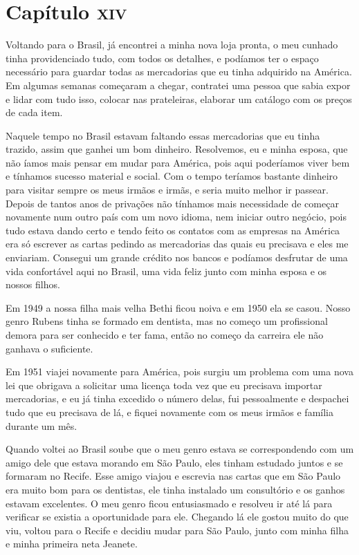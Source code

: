 \chapter{Capítulo \textsc{xiv}}

Voltando para o Brasil, já encontrei a minha nova loja pronta, o meu
cunhado tinha providenciado tudo, com todos os detalhes, e podíamos ter
o espaço necessário para guardar todas as mercadorias que eu tinha
adquirido na América. Em algumas semanas começaram a chegar, contratei
uma pessoa que sabia expor e lidar com tudo isso, colocar nas
prateleiras, elaborar um catálogo com os preços de cada item.

Naquele tempo no Brasil estavam faltando essas mercadorias que eu tinha
trazido, assim que ganhei um bom dinheiro. Resolvemos, eu e minha
esposa, que não íamos mais pensar em mudar para América, pois aqui
poderíamos viver bem e tínhamos sucesso material e social. Com o tempo
teríamos bastante dinheiro para visitar sempre os meus irmãos e irmãs, e
seria muito melhor ir passear. Depois de tantos anos de privações não
tínhamos mais necessidade de começar novamente num outro país com um
novo idioma, nem iniciar outro negócio, pois tudo estava dando certo e
tendo feito os contatos com as empresas na América era só escrever as
cartas pedindo as mercadorias das quais eu precisava e eles me
enviariam. Consegui um grande crédito nos bancos e podíamos desfrutar de
uma vida confortável aqui no Brasil, uma vida feliz junto com minha
esposa e os nossos filhos.

Em 1949 a nossa filha mais velha Bethi ficou noiva e em 1950 ela se
casou. Nosso genro Rubens tinha se formado em dentista, mas no começo um
profissional demora para ser conhecido e ter fama, então no começo da
carreira ele não ganhava o suficiente.

Em 1951 viajei novamente para América, pois surgiu um problema com uma
nova lei que obrigava a solicitar uma licença toda vez que eu precisava
importar mercadorias, e eu já tinha excedido o número delas, fui
pessoalmente e despachei tudo que eu precisava de lá, e fiquei novamente
com os meus irmãos e família durante um mês.

Quando voltei ao Brasil soube que o meu genro estava se correspondendo
com um amigo dele que estava morando em São Paulo, eles tinham estudado
juntos e se formaram no Recife. Esse amigo viajou e escrevia nas cartas
que em São Paulo era muito bom para os dentistas, ele tinha instalado um
consultório e os ganhos estavam excelentes. O meu genro ficou
entusiasmado e resolveu ir até lá para verificar se existia a
oportunidade para ele. Chegando lá ele gostou muito do que viu, voltou
para o Recife e decidiu mudar para São Paulo, junto com minha filha e
minha primeira neta Jeanete.

